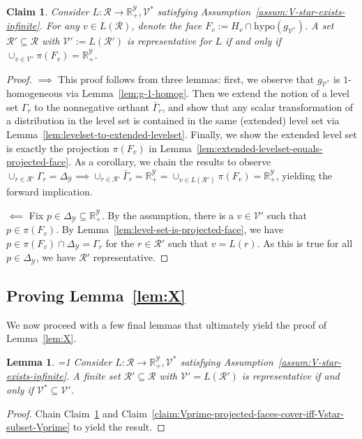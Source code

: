 \documentclass[11pt]{article}
\newcommand{\Comments}{1}
\newcommand{\mynote}[2]{\ifnum\Comments=1\textcolor{#1}{#2}\fi}
\newcommand{\mytodo}[2]{\ifnum\Comments=1%
  \todo[linecolor=#1!80!black,backgroundcolor=#1,bordercolor=#1!80!black]{#2}\fi}
\newcommand{\raf}[1]{\mynote{darkgreen}{[RF: #1]}}
\newcommand{\btw}[1]{\mytodo{gray!20!white}{BTW: #1}}%
\newcommand{\reals}{\mathbb{R}}
\newcommand{\simplex}{\Delta_\Y}
\newcommand{\R}{\mathcal{R}}
\newcommand{\V}{\mathcal{V}}
\newcommand{\Y}{\mathcal{Y}}
\newcommand{\hyp}{\mathrm{hypo}}
\newtheorem{lemma}{Lemma}
\newtheorem{claim}{Claim}
\begin{document}
\begin{claim}\label{claim:projected-faces-cover-RY-iff-representative}
	Consider $L : \R \to \reals^\Y_+, \V^*$ satisfying Assumption~\ref{assum:V-star-exists-infinite}.
	For any $v \in L(\R)$, denote the face $F_v := H_v \cap \hyp(g_{\V^*})$.
	A set $\R' \subseteq \R$ with $\V' := L(\R')$ is representative for $L$ if and only if $\cup_{v \in \V'} \pi(F_v) = \reals^\Y_+$.  
\end{claim}
\begin{proof}
	$\implies$
	This proof follows from three lemmas: first, we observe that $g_{\V^*}$ is $1$-homogeneous via Lemma~\ref{lem:g-1-homog}.
	Then we extend the notion of a level set $\Gamma_r$ to the nonnegative orthant $\bar \Gamma_r$, and show that any scalar transformation of a distribution in the level set is contained in the same (extended) level set via Lemma~\ref{lem:levelset-to-extended-levelset}.
	Finally, we show the extended level set is exactly the projection $\pi(F_v)$ in Lemma~\ref{lem:extended-levelset-equals-projected-face}.
	As a corollary, we chain the results to observe $\cup_{r \in \R'} \Gamma_r = \simplex \implies \cup_{r \in \R'} \bar \Gamma_r = \reals_+^\Y = \cup_{v \in L(\R')}\pi(F_v) = \reals^\Y_+$, yielding the forward implication.
	
	
	$\impliedby$
	Fix $p \in \simplex \subseteq \reals^\Y_+$.
	By the assumption, there is a $v \in \V'$ such that $p \in \pi(F_v)$.
	By Lemma~\ref{lem:level-set-is-projected-face}, we have $p \in \pi(F_v) \cap \simplex = \Gamma_r$ for the $r \in \R'$ such that $v = L(r)$.
	As this is true for all $p \in \simplex$, we have $\R'$ representative.
	
	
\end{proof}

\subsection{Proving Lemma~\ref{lem:X}}\label{subsec:lem-X-proof}
We now proceed with a few final lemmas that ultimately yield the proof of Lemma~\ref{lem:X}.

\begin{lemma}\label{lem:lemX1-rep-iff-subset-vectors}
	\btw{(1)}
	Consider $L : \R \to \reals^\Y_+, \V^*$ satisfying Assumption~\ref{assum:V-star-exists-infinite}.
	A finite set $\R' \subseteq \R$ with $\V' = L(\R')$ is representative if and only if $\V^* \subseteq \V'$.
\end{lemma}
\begin{proof}
	Chain Claim~\ref{claim:projected-faces-cover-RY-iff-representative} and Claim~\ref{claim:Vprime-projected-faces-cover-iff-Vstar-subset-Vprime} to yield the result.
\end{proof}
\end{document}
